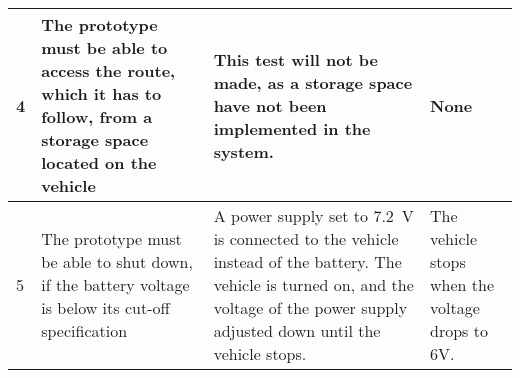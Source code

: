 \begin{table}[H]
\begin{tabular}{|p{1cm}|p{4cm}|p{7cm}|p{3cm}|}
\hline%
           4    &   The prototype must be able to access the route, which it has to follow, from a storage space located on the vehicle & This test will not be made, as a storage space have not been implemented in the system.   & None                 \\
\hline%
           5    &   The prototype must be able to shut down, if the battery voltage is below its cut-off specification &   A power supply set to \SI{7,2}{V} is connected to the vehicle instead of the battery. The vehicle is turned on, and the voltage of the power supply adjusted down until the vehicle stops.   &   The vehicle stops when the voltage drops to 6V.               \\
\hline
\end{tabular}
\end{table}

